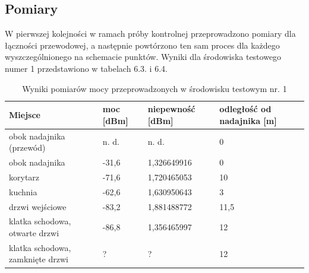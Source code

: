 \documentclass[12pt, twoside, openany]{mwrep}
\begin{document}
\subsection{Pomiary}
W pierwszej kolejności w ramach próby kontrolnej przeprowadzono pomiary dla łączności przewodowej, a następnie powtórzono ten sam proces dla każdego wyszczególnionego na schemacie punktów. Wyniki dla środowiska testowego numer 1 przedstawiono w tabelach 6.3. i 6.4.
\begin{table}[H]
\begin{tabular}{|l|l|l|l|}
\hline
Miejsce                          & moc {[}dBm{]} & niepewność   {[}dBm{]} & odległość   od nadajnika {[}m{]} \\ \hline
obok nadajnika (przewód)         & n. d.         & n. d.                  & 0                                \\ \hline
obok nadajnika                   & -31,6           & 1,326649916            & 0                                \\ \hline
korytarz                         & -71,6           & 1,720465053            & 10                               \\ \hline
kuchnia                          & -62,6           & 1,630950643            & 3                                \\ \hline
drzwi wejściowe                  & -83,2           & 1,881488772            & 11,5                             \\ \hline
klatka schodowa, otwarte drzwi   & -86,8           & 1,356465997            & 12                               \\ \hline
klatka schodowa, zamknięte drzwi & ?             & ?                      & 12                               \\ \hline
\end{tabular}
\caption{Wyniki pomiarów mocy przeprowadzonych w środowisku testowym nr. 1}
\end{table}
\end{document}
